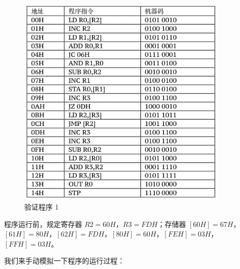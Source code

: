 \documentclass[12pt]{article}
\begin{document}
{        \begin{figure}[!ht]
            \centering
            \includegraphics[width=0.9\textwidth]{测试程序.png}
            \caption{验证程序 1}
            \label{fig:6-1}
        \end{figure}
        
        程序运行前，规定寄存器 $R2=60H$，$R3=FDH$；存储器 $[60H]=67H$，$[61H]=80H$，$[62H]=FDH$，$[80H]=60H$，$[FEH]=03H$，$[FFH]=03H$。
    
        我们来手动模拟一下程序的运行过程：
        
}
\end{document}

